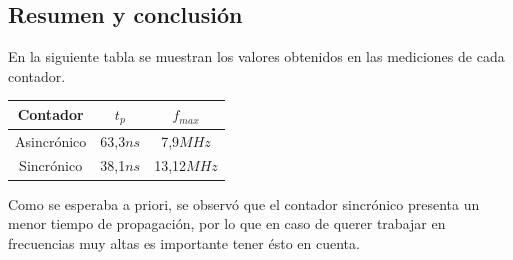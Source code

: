\subsection{Resumen y conclusi\'on}
\noindent
En la siguiente tabla se muestran los valores obtenidos en las mediciones de cada contador.
%
\begin{table}[H]
\centering
\begin{tabular}{|c|c|c|}
\hline
\textbf{Contador} & \textbf{$t_{p}$} & \textbf{$f_{max}$} \\ \hline
Asincr\'onico       & 63,3$ns$           & 7,9$MHz$          \\ \hline
Sincr\'onico        & 38,1$ns$           & 13,12$MHz$        \\ \hline
\end{tabular}
\end{table}
\noindent
Como se esperaba a priori, se observ\'o que el contador sincr\'onico presenta un menor tiempo de propagaci\'on, por lo que en caso de querer trabajar en frecuencias muy altas es importante tener \'esto en cuenta. 
